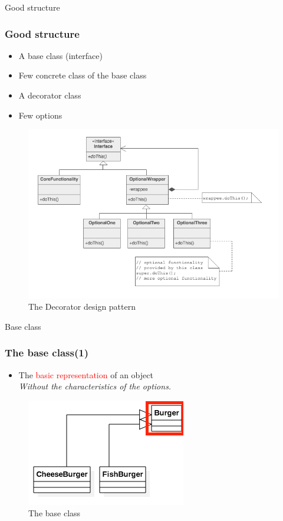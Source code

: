 \documentclass{beamer}
\begin{document}
  \begin{frame}{Good structure}
    \frametitle{Good structure}
    \begin{itemize}
      \item A base class (interface)
      \item Few concrete class of the base class
      \item A decorator class
      \item Few options
    \end{itemize}
    \begin{figure}[!b]
      \centering
      \includegraphics[scale=0.27]{good}
      \caption{The Decorator design pattern}
    \end{figure}
  \end{frame}

  \begin{frame}{Base class}
    \frametitle{The base class(1)}
    \begin{itemize}
      \item The \textcolor{red}{basic representation} of an object \\
      \textit{Without the characteristics of the options.}
    \end{itemize}
    \begin{figure}[!b]
      \centering
      \includegraphics[scale=0.4]{Base}
      \caption{The base class}
    \end{figure}
  \end{frame}
\end{document}

